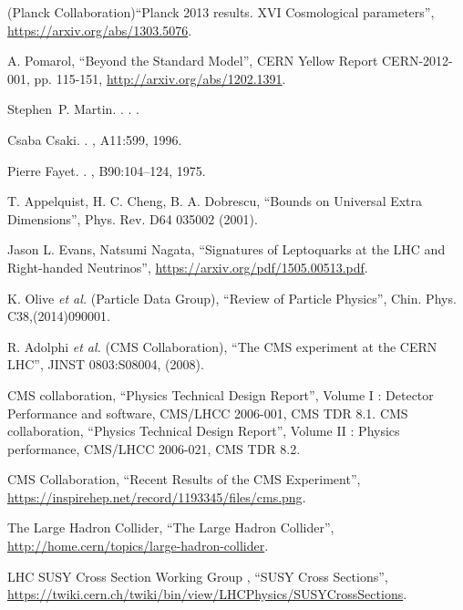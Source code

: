 \begin{thebibliography}{99}
  (Planck Collaboration)``Planck 2013 results. XVI Cosmological parameters'', \url{https://arxiv.org/abs/1303.5076}.


 A. Pomarol, ``Beyond the Standard Model'', CERN Yellow Report CERN-2012-001, pp. 115-151, \url{http://arxiv.org/abs/1202.1391}.


Stephen~P. Martin.
.
.
.




Csaba Csaki.
.
, A11:599, 1996.


Pierre Fayet.
.
, B90:104--124, 1975.


 T. Appelquist, H. C. Cheng, B. A. Dobrescu, ``Bounds on Universal Extra Dimensions'', Phys. Rev. D64 035002 (2001).




 Jason L. Evans, Natsumi Nagata, ``Signatures of Leptoquarks at the LHC
and Right-handed Neutrinos'', {\url {https://arxiv.org/pdf/1505.00513.pdf}}.


 K. Olive {\it et al.} (Particle Data Group), ``Review of Particle Physics'', Chin. Phys. C38,(2014)090001.


 R. Adolphi {\it et al.} (CMS Collaboration), ``The CMS experiment at the CERN LHC'', JINST 0803:S08004, (2008).

 CMS collaboration, ``Physics Technical Design Report'', Volume I : Detector Performance and software, CMS/LHCC 2006-001, CMS TDR 8.1.
 CMS collaboration, ``Physics Technical Design Report'', Volume II : Physics performance, CMS/LHCC 2006-021, CMS TDR 8.2.



 CMS Collaboration, ``Recent Results of the CMS Experiment'', \url{https://inspirehep.net/record/1193345/files/cms.png}.

 The Large Hadron Collider, ``The Large Hadron Collider'', \url{http://home.cern/topics/large-hadron-collider}.

 LHC SUSY Cross Section Working Group , ``SUSY Cross Sections'', \url{https://twiki.cern.ch/twiki/bin/view/LHCPhysics/SUSYCrossSections}.


\end{thebibliography}
